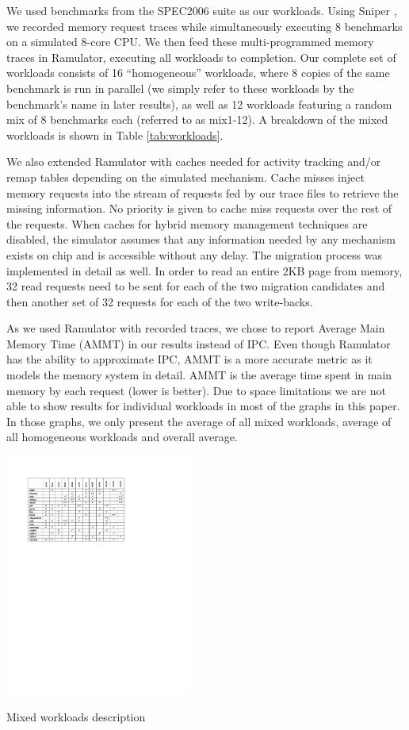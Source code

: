 We used benchmarks from the SPEC2006 suite \cite{spec} as our workloads. Using Sniper \cite{sniper}, we recorded memory request traces while simultaneously executing 8 benchmarks on a simulated 8-core CPU. We then feed these multi-programmed memory traces in Ramulator, executing all workloads to completion. Our complete set of workloads consists of 16 ``homogeneous'' workloads, where 8 copies of the same benchmark is run in parallel (we simply refer to these workloads by the benchmark's name in later results), as well as 12 workloads featuring a random mix of 8 benchmarks each (referred to as mix1-12). A breakdown of the mixed workloads is shown in Table \ref{tab:workloads}.

We also extended Ramulator with caches needed for activity tracking and/or remap tables depending on the simulated mechanism. Cache misses inject memory requests into the stream of requests fed by our trace files to retrieve the missing information. No priority is given to cache miss requests over the rest of the requests. When caches for hybrid memory management techniques are disabled, the simulator assumes that any information needed by any mechanism exists on chip and is accessible without any delay. The migration process was implemented in detail as well. In order to read an entire 2KB page from memory, 32 read requests need to be sent for each of the two migration candidates and then another set of 32 requests for each of the two write-backs.

As we used Ramulator with recorded traces, we chose to report Average Main Memory Time (AMMT) in our results instead of IPC. Even though Ramulator has the ability to approximate IPC, AMMT is a more accurate metric as it models the memory system in detail. AMMT is the average time spent in main memory by each request (lower is better). Due to space limitations we are not able to show results for individual workloads in most of the graphs in this paper. In those graphs, we only present the average of all mixed workloads, average of all homogeneous workloads and overall average.

\begin{table}
  \includegraphics[width=0.46\textwidth]{figures/workloads_checkmarks.pdf}
  \caption{Mixed workloads description}
  \label{tab:workloads}
\end{table}

